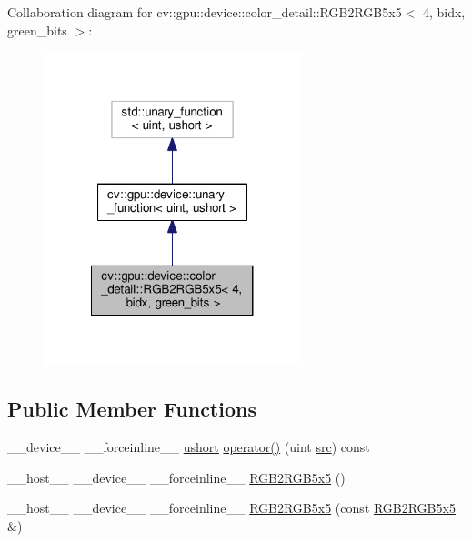 Collaboration diagram for cv\-:\-:gpu\-:\-:device\-:\-:color\-\_\-detail\-:\-:R\-G\-B2\-R\-G\-B5x5$<$ 4, bidx, green\-\_\-bits $>$\-:\nopagebreak
\begin{figure}[H]
\begin{center}
\leavevmode
\includegraphics[width=212pt]{structcv_1_1gpu_1_1device_1_1color__detail_1_1RGB2RGB5x5_3_014_00_01bidx_00_01green__bits_01_4__coll__graph}
\end{center}
\end{figure}
\subsection*{Public Member Functions}
\begin{DoxyCompactItemize}
\item 
\-\_\-\-\_\-device\-\_\-\-\_\- \-\_\-\-\_\-forceinline\-\_\-\-\_\- \hyperlink{core_2types__c_8h_ab95f123a6c9bcfee6a343170ef8c5f69}{ushort} \hyperlink{structcv_1_1gpu_1_1device_1_1color__detail_1_1RGB2RGB5x5_3_014_00_01bidx_00_01green__bits_01_4_a91dbc84ef82ee7fe05acf8e8c694d851}{operator()} (uint \hyperlink{legacy_8hpp_a371cd109b74033bc4366f584edd3dacc}{src}) const 
\item 
\-\_\-\-\_\-host\-\_\-\-\_\- \-\_\-\-\_\-device\-\_\-\-\_\- \-\_\-\-\_\-forceinline\-\_\-\-\_\- \hyperlink{structcv_1_1gpu_1_1device_1_1color__detail_1_1RGB2RGB5x5_3_014_00_01bidx_00_01green__bits_01_4_a640cee1a111499bd06cb6a6a007fae83}{R\-G\-B2\-R\-G\-B5x5} ()
\item 
\-\_\-\-\_\-host\-\_\-\-\_\- \-\_\-\-\_\-device\-\_\-\-\_\- \-\_\-\-\_\-forceinline\-\_\-\-\_\- \hyperlink{structcv_1_1gpu_1_1device_1_1color__detail_1_1RGB2RGB5x5_3_014_00_01bidx_00_01green__bits_01_4_a6140e4dabc1ba20da925b2c8a168371f}{R\-G\-B2\-R\-G\-B5x5} (const \hyperlink{structcv_1_1gpu_1_1device_1_1color__detail_1_1RGB2RGB5x5}{R\-G\-B2\-R\-G\-B5x5} \&)
\end{DoxyCompactItemize}


